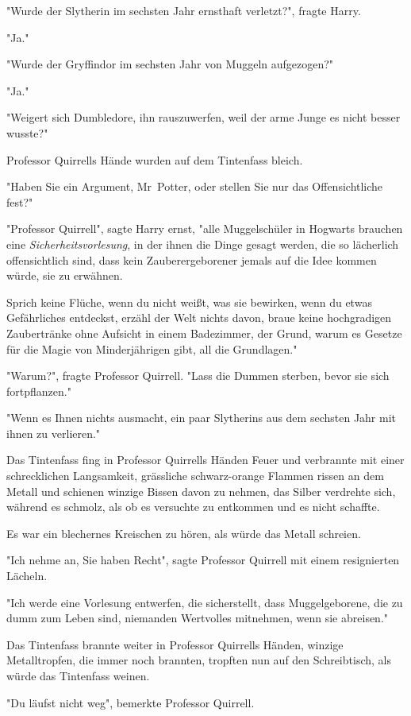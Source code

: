 {"Wurde der Slytherin im sechsten Jahr ernsthaft verletzt?", fragte Harry.

"Ja."

"Wurde der Gryffindor im sechsten Jahr von Muggeln aufgezogen?"

"Ja."

"Weigert sich Dumbledore, ihn rauszuwerfen, weil der arme Junge es nicht besser wusste?"

Professor Quirrells Hände wurden auf dem Tintenfass bleich.

"Haben Sie ein Argument, Mr~Potter, oder stellen Sie nur das Offensichtliche fest?"

"Professor Quirrell", sagte Harry ernst, "alle Muggelschüler in Hogwarts brauchen eine \emph{Sicherheitsvorlesung}, in der ihnen die Dinge gesagt werden, die so lächerlich offensichtlich sind, dass kein Zauberergeborener jemals auf die Idee kommen würde, sie zu erwähnen.

Sprich keine Flüche, wenn du nicht weißt, was sie bewirken, wenn du etwas Gefährliches entdeckst, erzähl der Welt nichts davon, braue keine hochgradigen Zaubertränke ohne Aufsicht in einem Badezimmer, der Grund, warum es Gesetze für die Magie von Minderjährigen gibt, all die Grundlagen."

"Warum?", fragte Professor Quirrell. "Lass die Dummen sterben, bevor sie sich fortpflanzen."

"Wenn es Ihnen nichts ausmacht, ein paar Slytherins aus dem sechsten Jahr mit ihnen zu verlieren."

Das Tintenfass fing in Professor Quirrells Händen Feuer und verbrannte mit einer schrecklichen Langsamkeit, grässliche schwarz-orange Flammen rissen an dem Metall und schienen winzige Bissen davon zu nehmen, das Silber verdrehte sich, während es schmolz, als ob es versuchte zu entkommen und es nicht schaffte.

Es war ein blechernes Kreischen zu hören, als würde das Metall schreien.

"Ich nehme an, Sie haben Recht", sagte Professor Quirrell mit einem resignierten Lächeln.

"Ich werde eine Vorlesung entwerfen, die sicherstellt, dass Muggelgeborene, die zu dumm zum Leben sind, niemanden Wertvolles mitnehmen, wenn sie abreisen."

Das Tintenfass brannte weiter in Professor Quirrells Händen, winzige Metalltropfen, die immer noch brannten, tropften nun auf den Schreibtisch, als würde das Tintenfass weinen.

"Du läufst nicht weg", bemerkte Professor Quirrell.

}
